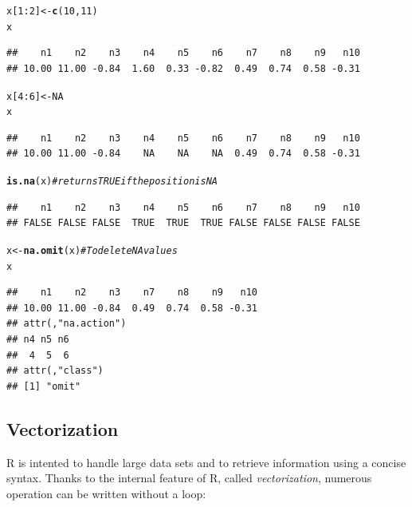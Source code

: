 \documentclass[10pt]{article}\usepackage[]{graphicx}\usepackage[]{color}
\makeatletter
\newcommand{\hlnum}[1]{\textcolor[rgb]{0.686,0.059,0.569}{#1}}%
\newcommand{\hlcom}[1]{\textcolor[rgb]{0.678,0.584,0.686}{\textit{#1}}}%
\newcommand{\hlopt}[1]{\textcolor[rgb]{0,0,0}{#1}}%
\newcommand{\hlstd}[1]{\textcolor[rgb]{0.345,0.345,0.345}{#1}}%
\newcommand{\hlkwb}[1]{\textcolor[rgb]{0.69,0.353,0.396}{#1}}%
\newcommand{\hlkwd}[1]{\textcolor[rgb]{0.737,0.353,0.396}{\textbf{#1}}}%
\newenvironment{kframe}{%
 \def\at@end@of@kframe{}%
 \ifinner\ifhmode%
  \def\at@end@of@kframe{\end{minipage}}%
  \begin{minipage}{\columnwidth}%
 \fi\fi%
 \def\FrameCommand##1{\hskip\@totalleftmargin \hskip-\fboxsep
 \colorbox{shadecolor}{##1}\hskip-\fboxsep
     \hskip-\linewidth \hskip-\@totalleftmargin \hskip\columnwidth}%
 \MakeFramed {\advance\hsize-\width
   \@totalleftmargin\z@ \linewidth\hsize
   \@setminipage}}%
 {\par\unskip\endMakeFramed%
 \at@end@of@kframe}
\newenvironment{knitrout}{}{} %
\makeatother
\begin{document}
\begin{knitrout}
\color{fgcolor}\begin{kframe}
\begin{alltt}
\hlstd{x[}\hlnum{1}\hlopt{:}\hlnum{2}\hlstd{]} \hlkwb{<-} \hlkwd{c}\hlstd{(}\hlnum{10}\hlstd{,}\hlnum{11}\hlstd{)}
\hlstd{x}
\end{alltt}
\begin{verbatim}
##    n1    n2    n3    n4    n5    n6    n7    n8    n9   n10 
## 10.00 11.00 -0.84  1.60  0.33 -0.82  0.49  0.74  0.58 -0.31
\end{verbatim}
\begin{alltt}
\hlstd{x[}\hlnum{4}\hlopt{:}\hlnum{6}\hlstd{]} \hlkwb{<-} \hlnum{NA}
\hlstd{x}
\end{alltt}
\begin{verbatim}
##    n1    n2    n3    n4    n5    n6    n7    n8    n9   n10 
## 10.00 11.00 -0.84    NA    NA    NA  0.49  0.74  0.58 -0.31
\end{verbatim}
\begin{alltt}
\hlkwd{is.na}\hlstd{(x)}              \hlcom{# returns TRUE if the position is NA}
\end{alltt}
\begin{verbatim}
##    n1    n2    n3    n4    n5    n6    n7    n8    n9   n10 
## FALSE FALSE FALSE  TRUE  TRUE  TRUE FALSE FALSE FALSE FALSE
\end{verbatim}
\begin{alltt}
\hlstd{x} \hlkwb{<-} \hlkwd{na.omit}\hlstd{(x)}       \hlcom{# To delete NA values}
\hlstd{x}
\end{alltt}
\begin{verbatim}
##    n1    n2    n3    n7    n8    n9   n10 
## 10.00 11.00 -0.84  0.49  0.74  0.58 -0.31 
## attr(,"na.action")
## n4 n5 n6 
##  4  5  6 
## attr(,"class")
## [1] "omit"
\end{verbatim}
\end{kframe}
\end{knitrout}
\medskip
\subsection{Vectorization}
R is intented to handle large data sets and to retrieve information using a concise syntax. Thanks to the internal feature of R, called \textit{vectorization}, numerous operation can be written without a loop:
\end{document}

